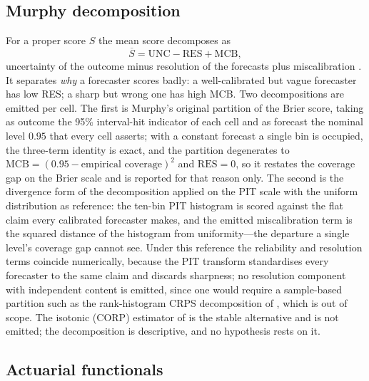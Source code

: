 \subsection{Murphy decomposition}

For a proper score $S$ the mean score decomposes as
\begin{equation}
  \overline{S} = \mathrm{UNC} - \mathrm{RES} + \mathrm{MCB},
\end{equation}
uncertainty of the outcome minus resolution of the forecasts plus
miscalibration \citep{murphy1973new,pohle2020murphy}. It separates
\emph{why} a forecaster scores badly: a well-calibrated but vague
forecaster has low RES; a sharp but wrong one has high MCB. Two
decompositions are emitted per cell. The first is Murphy's original
partition of the Brier score, taking as outcome the 95\% interval-hit
indicator of each cell and as forecast the nominal level $0.95$ that every
cell asserts; with a constant forecast a single bin is occupied, the
three-term identity is exact, and the partition degenerates to
$\mathrm{MCB}=(0.95-\text{empirical coverage})^2$ and $\mathrm{RES}=0$,
so it restates the coverage gap on the Brier scale and is reported for
that reason only. The second is the divergence form of the decomposition
\citep{broecker2009reliability} applied on the PIT scale with the uniform
distribution as reference: the ten-bin PIT histogram is scored against
the flat claim every calibrated forecaster makes, and the emitted
miscalibration term is the squared distance of the histogram from
uniformity---the departure a single level's coverage gap cannot see.
Under this reference the reliability and resolution terms coincide
numerically, because the PIT transform standardises every forecaster to
the same claim and discards sharpness; no resolution component with
independent content is emitted, since one would require a sample-based
partition such as the rank-histogram CRPS decomposition of
\citet{hersbach2000decomposition}, which is out of scope. The isotonic
(CORP) estimator of \citet{dimitriadis2021stable} is the stable
alternative and is not emitted; the decomposition is descriptive, and no
hypothesis rests on it.

\subsection{Actuarial functionals}
\label{sec:metrics-actuarial}

